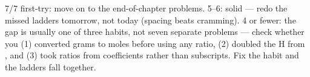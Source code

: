 \documentclass{apchem-worksheet}
\begin{document}
\begin{apcnote}
7/7 first-try: move on to the end-of-chapter problems. 5--6: solid ---
redo the missed ladders tomorrow, not today (spacing beats cramming).
4 or fewer: the gap is usually one of three habits, not seven separate
problems --- check whether you (1) converted grams to moles before using
any ratio, (2) doubled the H from , and (3) took ratios from
coefficients rather than subscripts. Fix the habit and the ladders fall
together.
\end{apcnote}
\end{document}
